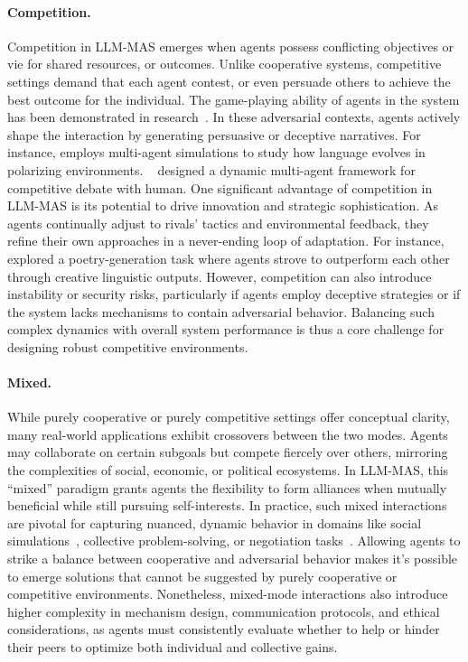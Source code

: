 \paragraph{Competition.} Competition in LLM-MAS emerges when agents possess conflicting objectives or vie for shared resources, or outcomes. Unlike cooperative systems, competitive settings demand that each agent contest, or even persuade others to achieve the best outcome for the individual. The game-playing ability of agents in the system has been demonstrated in research~\cite{evaluating_llm_game_ability}. In these adversarial contexts, agents actively shape the interaction by generating persuasive or deceptive narratives. For instance, \cite{social_media_regulation} employs multi-agent simulations to study how language evolves in polarizing environments. ~\cite{agent4debate} designed a dynamic multi-agent framework for competitive debate with human.  One significant advantage of competition in LLM-MAS is its potential to drive innovation and strategic sophistication. As agents continually adjust to rivals’ tactics and environmental feedback, they refine their own approaches in a never-ending loop of adaptation. For instance,~\cite{mas_for_poetry_generation} explored a poetry-generation task where agents strove to outperform each other through creative linguistic outputs. However, competition can also introduce instability or security risks, particularly if agents employ deceptive strategies or if the system lacks mechanisms to contain adversarial behavior. Balancing such complex dynamics with overall system performance is thus a core challenge for designing robust competitive environments.


\paragraph{Mixed.} While purely cooperative or purely competitive settings offer conceptual clarity, many real-world applications exhibit crossovers between the two modes. Agents may collaborate on certain subgoals but compete fiercely over others, mirroring the complexities of social, economic, or political ecosystems. In LLM-MAS, this “mixed” paradigm grants agents the flexibility to form alliances when mutually beneficial while still pursuing self-interests. In practice, such mixed interactions are pivotal for capturing nuanced, dynamic behavior in domains like social simulations~\cite{community_knowledge_flooding,sct_society}, collective problem-solving, or negotiation tasks~\cite{polca_mas_for_political,richeliey_diplomacy_society}. Allowing agents to strike a balance between cooperative and adversarial behavior makes it's possible to emerge solutions that cannot be suggested by purely cooperative or competitive environments. Nonetheless, mixed-mode interactions also introduce higher complexity in mechanism design, communication protocols, and ethical considerations, as agents must consistently evaluate whether to help or hinder their peers to optimize both individual and collective gains.